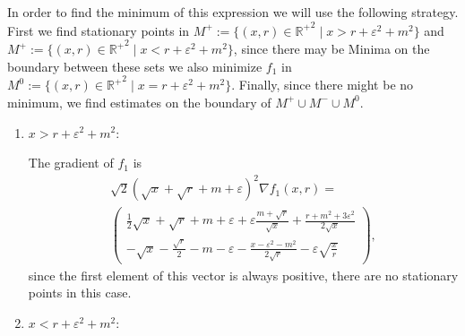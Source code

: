 \documentclass[b5paper,draft,openbib,12pt]{memoir}
\begin{document}
In order to find the minimum of this expression we will use the following strategy. First we find stationary points in  
\(M^+:=\{(x,r)\in{\mathbb{R}^+}^2\mid x>r+\varepsilon^2+m^2\}\) and 
\(M^+:=\{(x,r)\in{\mathbb{R}^+}^2\mid x<r+\varepsilon^2+m^2\}\), since there may be Minima on the boundary 
between these sets we also minimize \(f_1\) in \(M^0:=\{(x,r)\in{\mathbb{R}^+}^2\mid x=r+\varepsilon^2+m^2\}\).
Finally, since there might be no minimum, we find estimates on the boundary of \(M^+\cup M^-\cup M^0\).
\begin{enumerate}[label=case \alph*),]
\item \(x>r+\varepsilon^2+m^2\):

The gradient of \(f_1\) is
\begin{multline*}
\sqrt{2}(\sqrt{x}+\sqrt{r}+m+\varepsilon)^2 \nabla f_1(x,r)= \\
\begin{pmatrix}
\frac{1}{2}\sqrt{x}+\sqrt{r}+m+\varepsilon+\varepsilon\frac{m+\sqrt{r}}{\sqrt{x}}+\frac{r+m^2+3\varepsilon^2}{2\sqrt{x}}\\
-\sqrt{x}-\frac{\sqrt{r}}{2}-m-\varepsilon -\frac{x-\varepsilon^2-m^2}{2\sqrt{r}}-\varepsilon\sqrt{\frac{x}{r}}
\end{pmatrix},
\end{multline*}
since the first element of this vector is always positive, there are no stationary points in this case.

\item \(x<r+\varepsilon^2+m^2\): 


\end{enumerate}
\end{document}

